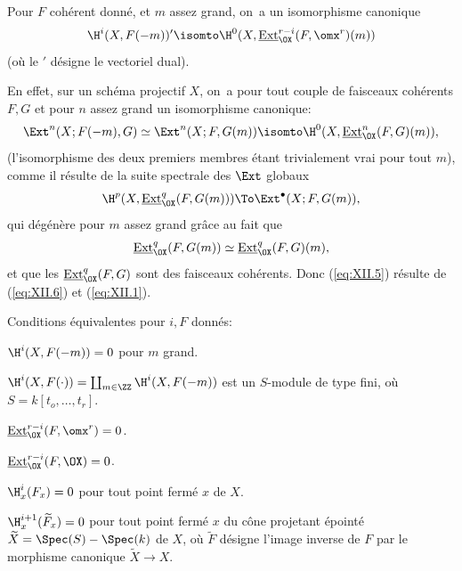\begin{corollaire} \label{XII.1.2} Pour $F$ coh\'erent donn\'e, et $m$ assez grand, on~a un isomorphisme canonique
\steco
\begin{equation} \label{eq:XII.5} {}\H^i(X, F(-m))'\isomto\H^0(X, \mathop{\underline{\mathrm{Ext}}}\nolimits_{\OX}^{r-i}(F, \omx^r)(m))
\end{equation}
(o\`u le $'$ d\'esigne le vectoriel dual).
\end{corollaire}
En effet, sur un sch\'ema projectif $X$, on~a pour tout couple de faisceaux coh\'erents $F, G$ et pour $n$ assez grand un isomorphisme canonique:
\steco
\begin{equation} \label{eq:XII.6} {}\Ext^n(X;F(-m), G)\simeq \Ext^n(X;F, G(m)) \isomto \H^0(X, \mathop{\underline{\mathrm{Ext}}}\nolimits_{\OX}^{n}(F, G)(m)),
\end{equation}
(l'isomorphisme des deux premiers membres \'etant trivialement vrai pour tout $m$), comme il r\'esulte de la suite spectrale des $\Ext$ globaux
\[
\H^p(X, \mathop{\underline{\mathrm{Ext}}}\nolimits^q_{\OX}(F, G(m))) \To \Ext^{\bullet}(X;F, G(m)),
\]
qui d\'eg\'en\`ere pour $m$ assez grand gr\^ace au fait que
\[
\mathop{\underline{\mathrm{Ext}}}\nolimits^q_{\OX}(F, G(m)) \simeq \mathop{\underline{\mathrm{Ext}}}\nolimits^q_{\OX}(F, G)(m),
\]
et que les $\mathop{\underline{\mathrm{Ext}}}\nolimits^q_{\OX}(F, G)$ sont des faisceaux coh\'erents. Donc (\ref{eq:XII.5}) r\'esulte de (\ref{eq:XII.6}) et (\ref{eq:XII.1}).

\begin{corollaire} \label{XII.1.3}
Conditions \'equivalentes pour $i, F$ donn\'es:
\begin{enumeratei}
\item
$\H^i(X, F(-m))=0$ pour $m$ grand.
\item[\textup{(i bis)}] $\H^i(X, F(\cdot))= \coprod_{m\in\ZZ}\H^i(X, F(-m))$ est un $S$-module de type fini, o\`u $S=k[t_o, \ldots, t_r]$.
\item
$\mathop{\underline{\mathrm{Ext}}}\nolimits^{r-i}_{\OX}(F, \omx^r)=0$.
\item[\textup{(ii bis)}] $\mathop{\underline{\mathrm{Ext}}}\nolimits^{r-i}_{\OX}(F, \OX)=0$.
\item
$\H^i_x(F_x)=0$ pour tout point ferm\'e $x$ de $X$.
\item
$\H^{i+1}_x(\widetilde{F}_x)=0$ pour tout point ferm\'e $x$ du c\^{o}ne projetant \'epoint\'e $\widetilde{X}=\Spec(S)-\Spec(k)$ de $X$, o\`u $\widetilde{F}$ d\'esigne l'image inverse de $F$ par le morphisme canonique $\widetilde{X}\to X$.
\end{enumeratei}
\end{corollaire}

